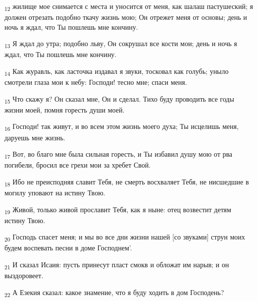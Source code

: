 \begin{tcolorbox}
\textsubscript{12} жилище мое снимается с места и уносится от меня, как шалаш пастушеский; я должен отрезать подобно ткачу жизнь мою; Он отрежет меня от основы; день и ночь я ждал, что Ты пошлешь мне кончину.
\end{tcolorbox}
\begin{tcolorbox}
\textsubscript{13} Я ждал до утра; подобно льву, Он сокрушал все кости мои; день и ночь я ждал, что Ты пошлешь мне кончину.
\end{tcolorbox}
\begin{tcolorbox}
\textsubscript{14} Как журавль, как ласточка издавал я звуки, тосковал как голубь; уныло смотрели глаза мои к небу: Господи! тесно мне; спаси меня.
\end{tcolorbox}
\begin{tcolorbox}
\textsubscript{15} Что скажу я? Он сказал мне, Он и сделал. Тихо буду проводить все годы жизни моей, помня горесть души моей.
\end{tcolorbox}
\begin{tcolorbox}
\textsubscript{16} Господи! так живут, и во всем этом жизнь моего духа; Ты исцелишь меня, даруешь мне жизнь.
\end{tcolorbox}
\begin{tcolorbox}
\textsubscript{17} Вот, во благо мне была сильная горесть, и Ты избавил душу мою от рва погибели, бросил все грехи мои за хребет Свой.
\end{tcolorbox}
\begin{tcolorbox}
\textsubscript{18} Ибо не преисподняя славит Тебя, не смерть восхваляет Тебя, не нисшедшие в могилу уповают на истину Твою.
\end{tcolorbox}
\begin{tcolorbox}
\textsubscript{19} Живой, только живой прославит Тебя, как я ныне: отец возвестит детям истину Твою.
\end{tcolorbox}
\begin{tcolorbox}
\textsubscript{20} Господь спасет меня; и мы во все дни жизни нашей [со звуками] струн моих будем воспевать песни в доме Господнем'.
\end{tcolorbox}
\begin{tcolorbox}
\textsubscript{21} И сказал Исаия: пусть принесут пласт смокв и обложат им нарыв; и он выздоровеет.
\end{tcolorbox}
\begin{tcolorbox}
\textsubscript{22} А Езекия сказал: какое знамение, что я буду ходить в дом Господень?
\end{tcolorbox}

